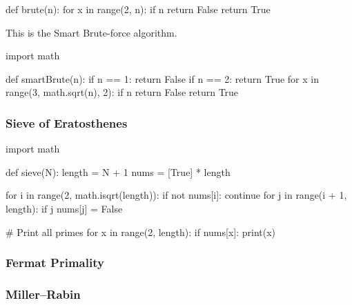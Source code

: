 \documentclass[main.tex]{subfiles}
\begin{document}
\begin{python}
    def brute(n):
        for x in range(2, n):
            if n %
                return False
        return True
\end{python}

\vspace{10mm}

This is the Smart Brute-force algorithm.

\begin{python}
    import math

    def smartBrute(n):
        if n == 1:
            return False
        if n == 2:
            return True
        for x in range(3, math.sqrt(n), 2):
            if n %
                return False
        return True
\end{python}

\subsubsection{Sieve of Eratosthenes}

\begin{python}
    import math

    def sieve(N):
        length = N + 1
        nums = [True] * length

        for i in range(2, math.isqrt(length)):
            if not nums[i]:
                continue
            for j in range(i + 1, length):
                if j %
                    nums[j] = False

        # Print all primes
        for x in range(2, length):
            if nums[x]:
                print(x)
\end{python}

\subsubsection{Fermat Primality}

\subsubsection{Miller–Rabin}
\end{document}
